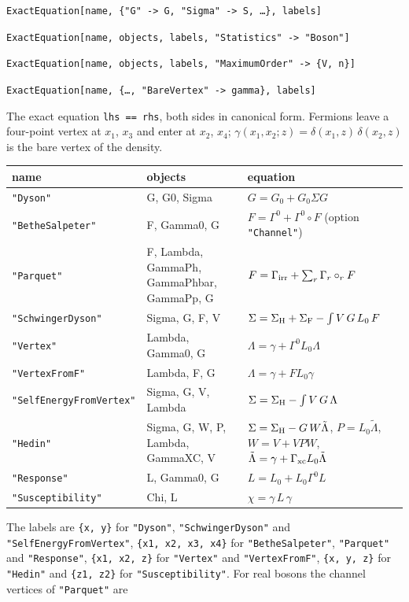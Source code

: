 \documentclass[11pt,a4paper]{article}
\makeatletter
\newcommand{\pkg}[1]{\texttt{#1}}
\newenvironment{function}[1]{\par\if@nobreak\else\medskip\needspace{4\baselineskip}\fi\noindent\phantomsection\label{fn:#1}%
  \begin{fnbox}}{\end{fnbox}\par\nobreak}
\newcommand{\syntax}[1]{\texttt{#1}\par}
\newcommand{\opt}[1]{\texttt{"#1"}}
\makeatother
\begin{document}
\begin{function}{ExactEquation}
\syntax{ExactEquation[name, \{"G" -> G, "Sigma" -> S, \dots\}, labels]}
\syntax{ExactEquation[name, objects, labels, "Statistics" -> "Boson"]}
\syntax{ExactEquation[name, objects, labels, "MaximumOrder" -> \{V, n\}]}
\syntax{ExactEquation[name, \{\dots, "BareVertex" -> gamma\}, labels]}
\end{function}
The exact equation \pkg{lhs == rhs}, both sides in canonical form. Fermions leave a four-point vertex at $x_1$, $x_3$ and
enter at $x_2$, $x_4$; $\gamma(x_1,x_2;z)=\delta(x_1,z)\,\delta(x_2,z)$ is the bare vertex of the density.
\begin{center}
\small
\begin{tabularx}{\textwidth}{@{}l>{\ttfamily\small\raggedright\arraybackslash}p{3.6cm}>{\raggedright\arraybackslash}X@{}}
\toprule
name & \textrm{objects} & equation\\
\midrule
\opt{Dyson} & G, G0, Sigma & $G=G_0+G_0\Sigma G$\\
\opt{BetheSalpeter} & F, Gamma0, G & $F=\Gamma^0+\Gamma^0\circ F$ (option \opt{Channel})\\
\opt{Parquet} & F, Lambda, GammaPh, GammaPhbar, GammaPp, G & $F=\Gamma_{\rm irr}+\sum_r\Gamma_r\circ_rF$\\
\opt{SchwingerDyson} & Sigma, G, F, V & $\Sigma=\Sigma_{\rm H}+\Sigma_{\rm F}-\int V\,G\,L_0\,F$\\
\opt{Vertex} & Lambda, Gamma0, G & $\Lambda=\gamma+\Gamma^0L_0\Lambda$\\
\opt{VertexFromF} & Lambda, F, G & $\Lambda=\gamma+FL_0\gamma$\\
\opt{SelfEnergyFromVertex} & Sigma, G, V, Lambda & $\Sigma=\Sigma_{\rm H}-\int V\,G\,\Lambda$\\
\opt{Hedin} & Sigma, G, W, P, Lambda, GammaXC, V & $\Sigma=\Sigma_{\rm H}-G\,W\tilde\Lambda$, $P=L_0\tilde\Lambda$,
$W=V+VPW$, $\tilde\Lambda=\gamma+\Gamma_{\rm xc}L_0\tilde\Lambda$\\
\opt{Response} & L, Gamma0, G & $L=L_0+L_0\Gamma^0L$\\
\opt{Susceptibility} & Chi, L & $\chi=\gamma\,L\,\gamma$\\
\bottomrule
\end{tabularx}
\end{center}
The labels are \pkg{\{x, y\}} for \opt{Dyson}, \opt{SchwingerDyson} and \opt{SelfEnergyFromVertex},
\pkg{\{x1, x2, x3, x4\}} for \opt{BetheSalpeter}, \opt{Parquet} and \opt{Response}, \pkg{\{x1, x2, z\}} for
\opt{Vertex} and \opt{VertexFromF}, \pkg{\{x, y, z\}} for \opt{Hedin} and \pkg{\{z1, z2\}} for \opt{Susceptibility}. For real bosons the channel vertices of \opt{Parquet} are
\end{document}
